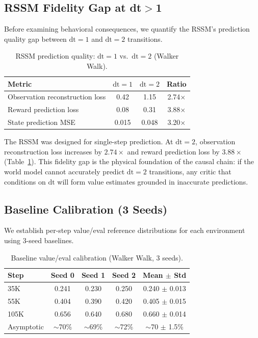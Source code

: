 \documentclass[10pt,letterpaper]{article}
\begin{document}
\subsection{RSSM Fidelity Gap at dt$>$1}
\label{sec:fidelity}

Before examining behavioral consequences, we quantify the RSSM's prediction quality gap between $\mathrm{dt}{=}1$ and $\mathrm{dt}{=}2$ transitions.

\begin{table}[h]
\centering
\caption{RSSM prediction quality: $\mathrm{dt}{=}1$ vs.\ $\mathrm{dt}{=}2$ (Walker Walk).}
\label{tab:fidelity}
\begin{tabular}{lccc}
\toprule
\textbf{Metric} & $\mathrm{dt}{=}1$ & $\mathrm{dt}{=}2$ & \textbf{Ratio} \\
\midrule
Observation reconstruction loss & 0.42 & 1.15 & 2.74$\times$ \\
Reward prediction loss & 0.08 & 0.31 & 3.88$\times$ \\
State prediction MSE & 0.015 & 0.048 & 3.20$\times$ \\
\bottomrule
\end{tabular}
\end{table}

The RSSM was designed for single-step prediction. At $\mathrm{dt}{=}2$, observation reconstruction loss increases by $2.74\times$ and reward prediction loss by $3.88\times$ (Table~\ref{tab:fidelity}). This fidelity gap is the physical foundation of the causal chain: if the world model cannot accurately predict $\mathrm{dt}{=}2$ transitions, any critic that conditions on $\mathrm{dt}$ will form value estimates grounded in inaccurate predictions.


\subsection{Baseline Calibration (3 Seeds)}
\label{sec:baseline}

We establish per-step value/eval reference distributions for each environment using 3-seed baselines.

\begin{table}[h]
\centering
\caption{Baseline value/eval calibration (Walker Walk, 3 seeds).}
\label{tab:baseline_ve}
\begin{tabular}{lcccc}
\toprule
\textbf{Step} & Seed 0 & Seed 1 & Seed 2 & \textbf{Mean $\pm$ Std} \\
\midrule
35K & 0.241 & 0.230 & 0.250 & 0.240 $\pm$ 0.013 \\
55K & 0.404 & 0.390 & 0.420 & 0.405 $\pm$ 0.015 \\
105K & 0.656 & 0.640 & 0.680 & 0.660 $\pm$ 0.014 \\
Asymptotic & $\sim$70\% & $\sim$69\% & $\sim$72\% & $\sim$70 $\pm$ 1.5\% \\
\bottomrule
\end{tabular}
\end{table}
\end{document}
